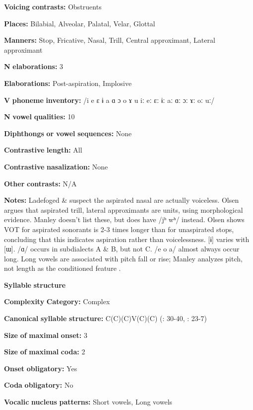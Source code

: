 \textbf{Voicing} \textbf{contrasts:} Obstruents

\textbf{Places:} Bilabial, Alveolar, Palatal, Velar, Glottal

\textbf{Manners:} Stop, Fricative, Nasal, Trill, Central approximant, Lateral approximant

\textbf{N} \textbf{elaborations:} 3

\textbf{Elaborations:} Post-aspiration, Implosive

\textbf{V} \textbf{phoneme} \textbf{inventory:} /i e ɛ ɨ a ɑ ɔ o ɤ u iː eː ɛː ɨː aː ɑː ɔː ɤː oː uː/

\textbf{N} \textbf{vowel} \textbf{qualities:} 10

\textbf{Diphthongs} \textbf{or} \textbf{vowel} \textbf{sequences:} None

\textbf{Contrastive} \textbf{length:} All

\textbf{Contrastive} \textbf{nasalization:} None

\textbf{Other} \textbf{contrasts:} N/A

\textbf{Notes:} Ladefoged \& \citet[116]{Maddieson1996} suspect the aspirated nasal are actually voiceless. Olsen argues that aspirated trill, lateral approximants are units, using morphological evidence. Manley doesn’t list these, but does have /jʰ wʰ/ instead. Olsen shows VOT for aspirated sonorants is 2-3 times longer than for unaspirated stops, concluding that this indicates aspiration rather than voicelessness. [ɨ] varies with [ɯ]. /ɑ/ occurs in subdialects A \& B, but not C. /e o a/ almost always occur long. Long vowels are associated with pitch fall or rise; Manley analyzes pitch, not length as the conditioned feature \citep[15]{Manley1972}.

\textbf{Syllable} \textbf{structure}

\textbf{Complexity} \textbf{Category:} Complex

\textbf{Canonical} \textbf{syllable} \textbf{structure:} C(C)(C)V(C)(C) (\citealt{Olsen2014}: 30-40, \citealt{Manley1972}: 23-7)

\textbf{Size} \textbf{of} \textbf{maximal} \textbf{onset:} 3

\textbf{Size} \textbf{of} \textbf{maximal} \textbf{coda:} 2

\textbf{Onset} \textbf{obligatory:} Yes

\textbf{Coda} \textbf{obligatory:} No

\textbf{Vocalic} \textbf{nucleus} \textbf{patterns:} Short vowels, Long vowels

